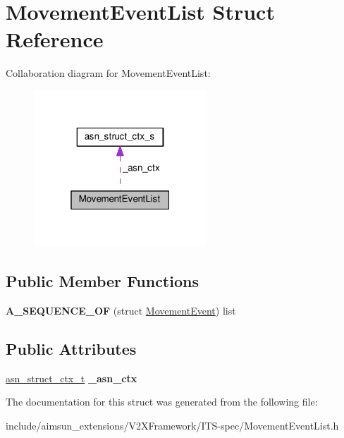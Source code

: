 \hypertarget{structMovementEventList}{}\section{Movement\+Event\+List Struct Reference}
\label{structMovementEventList}


Collaboration diagram for Movement\+Event\+List\+:\nopagebreak
\begin{figure}[H]
\begin{center}
\leavevmode
\includegraphics[width=184pt]{structMovementEventList__coll__graph}
\end{center}
\end{figure}
\subsection*{Public Member Functions}
\begin{DoxyCompactItemize}
\item 
{\bfseries A\+\_\+\+S\+E\+Q\+U\+E\+N\+C\+E\+\_\+\+OF} (struct \hyperlink{structMovementEvent}{Movement\+Event}) list\hypertarget{structMovementEventList_ac2c27618f558347fad5186b5e623e90f}{}\label{structMovementEventList_ac2c27618f558347fad5186b5e623e90f}

\end{DoxyCompactItemize}
\subsection*{Public Attributes}
\begin{DoxyCompactItemize}
\item 
\hyperlink{structasn__struct__ctx__s}{asn\+\_\+struct\+\_\+ctx\+\_\+t} {\bfseries \+\_\+asn\+\_\+ctx}\hypertarget{structMovementEventList_ae25c4b2af6d4c38fc17da22fb09bd30d}{}\label{structMovementEventList_ae25c4b2af6d4c38fc17da22fb09bd30d}

\end{DoxyCompactItemize}


The documentation for this struct was generated from the following file\+:\begin{DoxyCompactItemize}
\item 
include/aimsun\+\_\+extensions/\+V2\+X\+Framework/\+I\+T\+S-\/spec/Movement\+Event\+List.\+h\end{DoxyCompactItemize}

